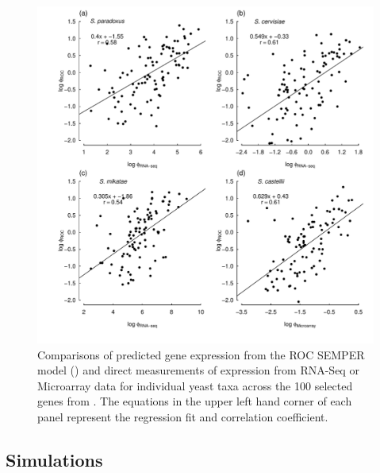 \documentclass{article}
\begin{document}
\begin{figure}[H]
  \centering
  \includegraphics[width=0.9\linewidth]{FIGURE_S2_Empirical_vs_ROC_by_spp.pdf}
  \caption{Comparisons of predicted gene expression from the ROC SEMPER model (\citet{GilchristEtAl2015}) and direct measurements of expression from RNA-Seq or Microarray data for individual yeast taxa across the 100 selected genes from \citet{SalichosAndRokas2013}.
      The equations in the upper left hand corner of each panel represent the regression fit and correlation coefficient.
  } 
  \label{fig:ROCvsEmpirical}
\end{figure}


\subsection*{Simulations}
\end{document}
